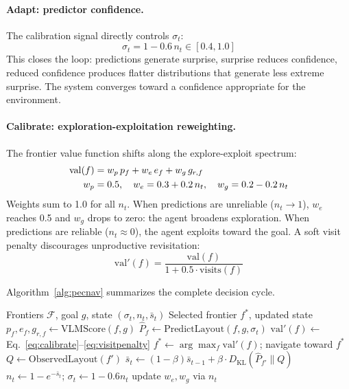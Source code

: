 \documentclass[10pt,twocolumn,letterpaper]{article}
\begin{document}
\paragraph{Adapt: predictor confidence.} The calibration signal directly controls $\sigma_t$:
\begin{equation}
    \sigma_t = 1 - 0.6\, n_t \in [0.4, 1.0]
    \label{eq:adapt}
\end{equation}
This closes the loop: predictions generate surprise, surprise reduces confidence, reduced confidence produces flatter distributions that generate less extreme surprise. The system converges toward a confidence appropriate for the environment.

\paragraph{Calibrate: exploration-exploitation reweighting.} The frontier value function shifts along the explore-exploit spectrum:
\begin{align}
    \mathrm{val}(f) &= w_p \, p_f + w_e \, e_f + w_g \, g_{r,f} \label{eq:calibrate} \\
    w_p &= 0.5, \quad w_e = 0.3 + 0.2\,n_t, \quad w_g = 0.2 - 0.2\,n_t \notag
\end{align}
Weights sum to 1.0 for all $n_t$. When predictions are unreliable ($n_t \to 1$), $w_e$ reaches 0.5 and $w_g$ drops to zero: the agent broadens exploration. When predictions are reliable ($n_t \approx 0$), the agent exploits toward the goal. A soft visit penalty discourages unproductive revisitation:
\begin{equation}
    \mathrm{val}'(f) = \frac{\mathrm{val}(f)}{1 + 0.5 \cdot \mathrm{visits}(f)}
    \label{eq:visitpenalty}
\end{equation}

Algorithm~\ref{alg:pecnav} summarizes the complete decision cycle.

\begin{algorithm}[H]
\caption{PEC-Nav decision cycle}
\label{alg:pecnav}
\begin{algorithmic}[1]
\REQUIRE Frontiers $\mathcal{F}$, goal $g$, state $(\sigma_t, n_t, \bar{s}_t)$
\ENSURE Selected frontier $f^*$, updated state
    \STATE $p_f, e_f, g_{r,f} \leftarrow \text{VLMScore}(f, g)$
    \STATE $\hat{P}_f \leftarrow \text{PredictLayout}(f, g, \sigma_t)$ 
    \STATE $\mathrm{val}'(f) \leftarrow$ Eq.~\ref{eq:calibrate}--\ref{eq:visitpenalty}
\ENDFOR
\STATE $f^* \leftarrow \arg\max_{f} \mathrm{val}'(f)$; navigate toward $f^*$
    \STATE $Q \leftarrow \text{ObservedLayout}(f')$ 
    \STATE $\bar{s}_t \leftarrow (1{-}\beta)\bar{s}_{t-1} + \beta \cdot D_{\mathrm{KL}}(\hat{P}_{f'} \| Q)$
    \STATE $n_t \leftarrow 1 - e^{-\bar{s}_t}$; \quad $\sigma_t \leftarrow 1 - 0.6 n_t$
    \STATE update $w_e, w_g$ via $n_t$
\ENDIF
\end{algorithmic}
\end{algorithm}
\end{document}
